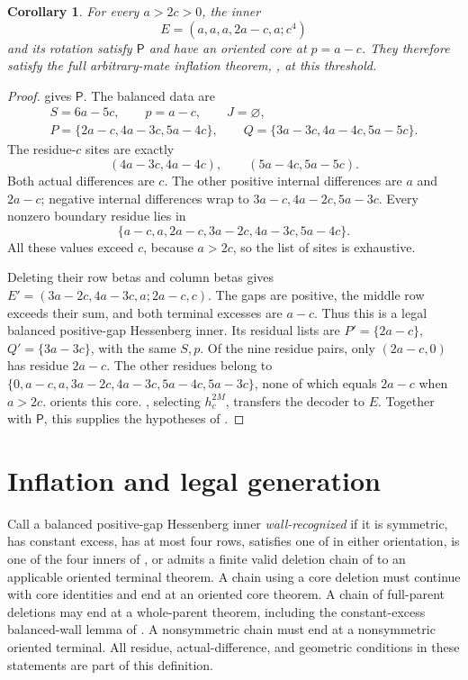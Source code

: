 \documentclass[11pt,a4paper]{amsart}
\numberwithin{equation}{section}
\theoremstyle{plain}
\newtheorem{corollary}[theorem]{Corollary}
\theoremstyle{definition}
\begin{document}
\begin{corollary}\label{cor:balanced-five-row-wall}
For every \(a>2c>0\), the inner
\[
 E=(a,a,a,2a-c,a;c^4)
\]
and its rotation satisfy \(\mathsf P\) and have an oriented core at \(p=a-c\).  They therefore satisfy the full arbitrary-mate inflation theorem, , at this threshold.
\end{corollary}
\begin{proof}
 gives \(\mathsf P\).  The balanced data are
\[
 \begin{gathered}
 S=6a-5c,\qquad p=a-c,\qquad J=\varnothing,\\
 P=\{2a-c,4a-3c,5a-4c\},\qquad
 Q=\{3a-3c,4a-4c,5a-5c\}.
 \end{gathered}
\]
The residue-\(c\) sites are exactly
\[
 (4a-3c,4a-4c),\qquad(5a-4c,5a-5c).
\]
Both actual differences are \(c\).  The other positive internal differences are \(a\) and \(2a-c\); negative internal differences wrap to \(3a-c,4a-2c,5a-3c\).  Every nonzero boundary residue lies in
\[
 \{a-c,a,2a-c,3a-2c,4a-3c,5a-4c\}.
\]
All these values exceed \(c\), because \(a>2c\), so the list of sites is exhaustive.

Deleting their row betas and column betas gives \(E'=(3a-2c,4a-3c,a;2a-c,c)\).  The gaps are positive, the middle row exceeds their sum, and both terminal excesses are \(a-c\).  Thus this is a legal balanced positive-gap Hessenberg inner.  Its residual lists are \(P'=\{2a-c\}\), \(Q'=\{3a-3c\}\), with the same \(S,p\).  Of the nine residue pairs, only \((2a-c,0)\) has residue \(2a-c\).  The other residues belong to \(\{0,a-c,a,3a-2c,4a-3c,5a-4c,5a-3c\}\), none of which equals \(2a-c\) when \(a>2c\).   orients this core.  , selecting \(h_c^{2M}\), transfers the decoder to \(E\).  Together with \(\mathsf P\), this supplies the hypotheses of .
\end{proof}

\section{Inflation and legal generation}\label{sec:inflation}

Call a balanced positive-gap Hessenberg inner \emph{wall-recognized} if it is symmetric, has constant excess, has at most four rows, satisfies one of  in either orientation, is one of the four inners of , or admits a finite valid deletion chain of  to an applicable oriented terminal theorem.  A chain using a core deletion must continue with core identities and end at an oriented core theorem.  A chain of full-parent deletions may end at a whole-parent theorem, including the constant-excess balanced-wall lemma of \cite{Shields2026PowerRigidity}.  A nonsymmetric chain must end at a nonsymmetric oriented terminal.  All residue, actual-difference, and geometric conditions in these statements are part of this definition.
\end{document}
